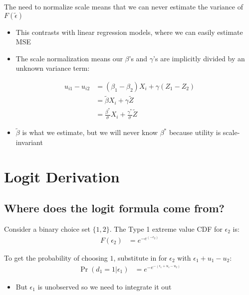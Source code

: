 \documentclass[11pt]{article}
\begin{document}
The need to normalize scale means that we can never estimate the variance of \(F\left(\tilde{\epsilon}\right)\)

\begin{itemize}
\item This contrasts with linear regression models, where we can easily estimate MSE
\item The scale normalization means our \(\beta\)'s and \(\gamma\)'s are implicitly divided by an unknown variance term:
\end{itemize}

\begin{align*}
u_{i1}-u_{i2}&=(\beta_1-\beta_2)X_i+\gamma (Z_1-Z_2)\\
             &=\tilde{\beta}X_i + \gamma \tilde{Z} \\
             &=\frac{\beta^*}{\sigma}X_i + \frac{\gamma^*}{\sigma}\tilde{Z}
\end{align*}

\begin{itemize}
\item \(\tilde{\beta}\) is what we estimate, but we will never know \(\beta^*\) because utility is scale-invariant
\end{itemize}


\section{Logit Derivation}
\label{sec:org25f2c42}

\subsection{Where does the logit formula come from?}
\label{sec:orgf6ad8bc}

Consider a binary choice set \(\{1,2\}\). The Type 1 extreme value CDF for \(\epsilon_2\) is:
\begin{align*}
F(\epsilon_2)&=e^{-e^{(-\epsilon_2)}}
\end{align*}

To get the probability of choosing \(1\), substitute in for \(\epsilon_2\) with \(\epsilon_1+u_1-u_2\):
\begin{align}
\Pr(d_1=1|\epsilon_1)&=e^{-e^{-(\epsilon_1+u_1-u_2)}}
\end{align}
\begin{itemize}
\item But \(\epsilon_1\) is unobserved so we need to integrate it out
\end{itemize}
\end{document}
